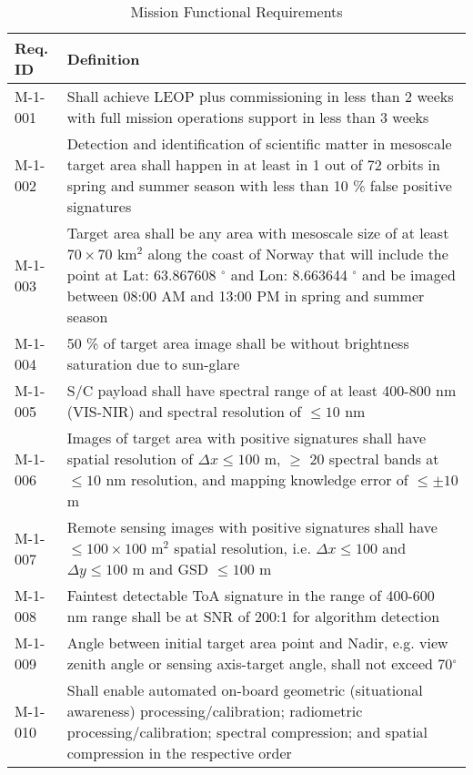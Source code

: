 \begin{table*}[htbp]
	\label{tab:func_reqs}
	\caption{Mission Functional Requirements}
	\centering
	\begin{tabular}{l p{15cm}}
			\hline
			\textbf{Req. ID}							&	\textbf{Definition} 			\\ 
			\hline 
			M-1-001  & Shall achieve LEOP plus commissioning in less than 2 weeks with full mission operations support in less than 3 weeks   \\
			\hline 															       
			M-1-002  & Detection and identification of scientific matter in mesoscale target area shall happen in at least in 1 out of 72 orbits in spring and summer season with less than 10 \% false positive signatures \\ 
			\hline
			M-1-003  & Target area shall be any area with mesoscale size of at least $70 \times 70$ km$^2$ along the coast of Norway that will include the point at Lat: 63.867608 $^{\circ}$ and Lon: 8.663644 $^{\circ}$ and be imaged between 08:00 AM and 13:00 PM in spring and summer season \\ 
			\hline
			M-1-004 & 50 \% of target area image shall be without brightness saturation due to sun-glare \\
			\hline
			M-1-005  & S/C payload shall have spectral range of at least 400-800 nm (VIS-NIR) and spectral resolution of $\leq 10$ nm \\ 
			\hline
			M-1-006  & Images of target area with positive signatures shall have spatial resolution of $\Delta x\leq100$ m, $\geq$ 20 spectral bands at $\leq 10$ nm resolution, and mapping knowledge error of $\leq \pm 10$ m \\
			\hline
			M-1-007 & Remote sensing images with positive signatures shall have $\leq 100 \times 100$ m$^2$ spatial resolution, i.e. $\Delta x\leq 100$ and $\Delta y\leq 100$ m and GSD $\leq 100$ m \\
			\hline
			M-1-008  & Faintest detectable ToA signature in the range of 400-600 nm range shall be at SNR of 200:1 for algorithm detection\\ 
			\hline
			M-1-009 & Angle between initial target area point and Nadir, e.g. view zenith angle or sensing axis-target angle, shall not exceed 70$^{\circ}$ \\
			\hline 
		  M-1-010  & Shall enable automated on-board geometric (situational awareness) processing/calibration; radiometric processing/calibration; spectral compression; and spatial compression in the respective order \\

\end{tabular}
\end{table*}
